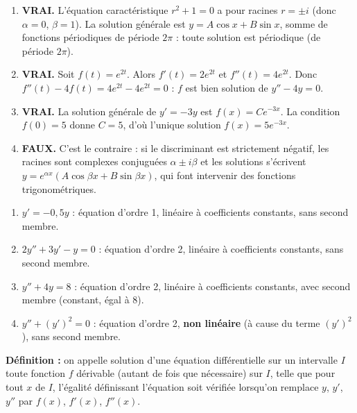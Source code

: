 \documentclass[11pt]{article}
\newcommand{\cle}[1]{{\popxbold\color{popdark}#1}}
\begin{document}
\begin{corrige}
\begin{enumerate}
\item \textbf{VRAI.} L'équation caractéristique $r^2 + 1 = 0$ a pour racines $r = \pm i$ (donc $\alpha = 0$, $\beta = 1$). La solution générale est $y = A\cos x + B\sin x$, somme de fonctions périodiques de période $2\pi$ : toute solution est périodique (de période $2\pi$).
\item \textbf{VRAI.} Soit $f(t) = e^{2t}$. Alors $f'(t) = 2e^{2t}$ et $f''(t) = 4e^{2t}$. Donc $f''(t) - 4f(t) = 4e^{2t} - 4e^{2t} = 0$ : $f$ est bien solution de $y'' - 4y = 0$.
\item \textbf{VRAI.} La solution générale de $y' = -3y$ est $f(x) = Ce^{-3x}$. La condition $f(0) = 5$ donne $C = 5$, d'où l'unique solution $f(x) = 5e^{-3x}$.
\item \textbf{FAUX.} C'est le contraire : si le discriminant est strictement négatif, les racines sont complexes conjuguées $\alpha \pm i\beta$ et les solutions s'écrivent $y = e^{\alpha x}(A\cos\beta x + B\sin\beta x)$, qui font intervenir des fonctions trigonométriques.
\end{enumerate}
\end{corrige}

\begin{corrige}
\begin{enumerate}
\item $y' = -0{,}5y$ : équation d'\cle{ordre 1}, linéaire à coefficients constants, sans second membre.
\item $2y'' + 3y' - y = 0$ : équation d'\cle{ordre 2}, linéaire à coefficients constants, sans second membre.
\item $y'' + 4y = 8$ : équation d'\cle{ordre 2}, linéaire à coefficients constants, avec second membre (constant, égal à $8$).
\item $y'' + (y')^2 = 0$ : équation d'\cle{ordre 2}, \textbf{non linéaire} (à cause du terme $(y')^2$), sans second membre.
\end{enumerate}
\textbf{Définition :} on appelle \cle{solution} d'une équation différentielle sur un intervalle $I$ toute fonction $f$ dérivable (autant de fois que nécessaire) sur $I$, telle que pour tout $x$ de $I$, l'égalité définissant l'équation soit vérifiée lorsqu'on remplace $y$, $y'$, $y''$ par $f(x)$, $f'(x)$, $f''(x)$.
\end{corrige}
\end{document}
